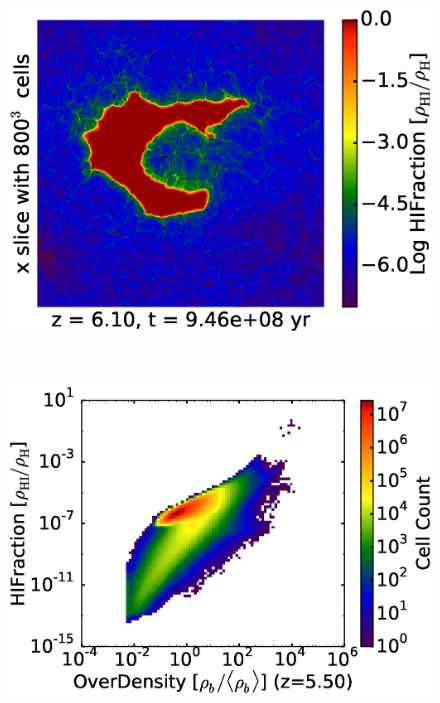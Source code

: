 \begin{figure}[!tp]
\begin{minipage}[h]{0.33\linewidth}
	\includegraphics[trim = 10mm 0mm 7mm 7mm, clip, width=1.0\textwidth]{3_3_slice_HIFraction_x_HD14475.eps}
	\end{minipage}
\vspace*{-2.00mm}\\
	\begin{minipage}[h]{0.33\linewidth}
	\centering
	\includegraphics[trim = 7mm 9mm 1mm 7mm, clip, width=1.0\textwidth]{4_1_HD20125OverDensityHIFraction.eps}
	\end{minipage}
\hspace*{-2.00mm}
	\begin{minipage}[h]{0.33\linewidth}
	\centering

\end{minipage}
\end{figure}
